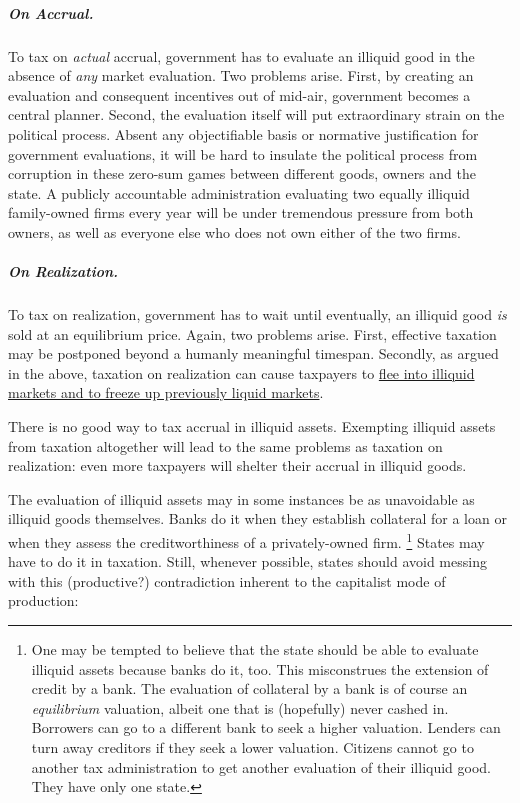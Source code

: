 \subparagraph{On Accrual.}
To tax on \emph{actual} accrual, government has to evaluate an illiquid good in the absence of \emph{any} market evaluation.
Two problems arise.
First, by creating an evaluation and consequent incentives out of mid-air, government becomes a central planner.
Second, the evaluation itself will put extraordinary strain on the political process.
Absent any objectifiable basis or normative justification for government evaluations, it will be hard to insulate the political process from corruption in these zero-sum games between different goods, owners and the state.
A publicly accountable administration evaluating two equally illiquid family-owned firms every year will be under tremendous pressure from both owners, as well as everyone else who does not own either of the two firms.

\subparagraph{On Realization.}
To tax on realization, government has to wait until eventually, an illiquid good \emph{is} sold at an equilibrium price.
Again, two problems arise.
First, effective taxation may be postponed beyond a humanly meaningful timespan.
Secondly, as argued in the above, taxation on realization can cause taxpayers to \href{sec:flight-2-illiquid}{flee into illiquid markets and to freeze up previously liquid markets}.

There is no good way to tax accrual in illiquid assets.
Exempting illiquid assets from taxation altogether will lead to the same problems as taxation on realization:
even more taxpayers will shelter their accrual in illiquid goods.

The evaluation of illiquid assets may in some instances be as unavoidable as illiquid goods themselves.
Banks do it when they establish collateral for a loan or when they assess the creditworthiness of a privately-owned firm.
\footnote{
	One may be tempted to believe that the state should be able to evaluate illiquid assets because banks do it, too.
	This misconstrues the extension of credit by a bank.
	The evaluation of collateral by a bank is of course an \emph{equilibrium} valuation, albeit one that is (hopefully) never cashed in.
	Borrowers can go to a different bank to seek a higher valuation.
	Lenders can turn away creditors if they seek a lower valuation.
	Citizens cannot go to another tax administration to get another evaluation of their illiquid good.
	They have only one state.
}
States may have to do it in taxation.
Still, whenever possible, states should avoid messing with this (productive?) contradiction inherent to the capitalist mode of production:

